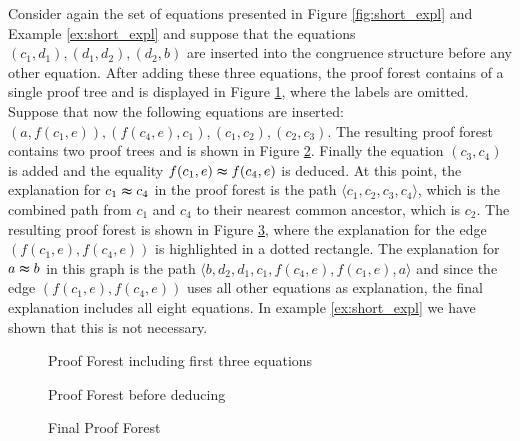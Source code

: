 \begin{example}

Consider again the set of equations presented in Figure \ref{fig:short_expl} and Example \ref{ex:short_expl} and suppose that the equations $(c_1,d_1),(d_1,d_2),(d_2,b)$ are inserted into the congruence structure before any other equation.
After adding these three equations, the proof forest contains of a single proof tree and is displayed in Figure \ref{fig:proof_forest_1}, where the labels are omitted.
Suppose that now the following equations are inserted: $(a,f(c_1,e)),(f(c_4,e),c_1),(c_1,c_2),(c_2,c_3)$.
The resulting proof forest contains two proof trees and is shown in Figure \ref{fig:proof_forest_2}.
Finally the equation $(c_3,c_4)$ is added and the equality $f(c_1,e) \thickapprox f(c_4,e)$ is deduced.
At this point, the explanation for $c_1 \thickapprox c_4$ in the proof forest is the path $\langle c_1,c_2,c_3,c_4 \rangle$, which is the combined path from $c_1$ and $c_4$ to their nearest common ancestor, which is $c_2$.
The resulting proof forest is shown in Figure \ref{fig:proof_forest_3}, where the explanation for the edge $(f(c_1,e),f(c_4,e))$ is highlighted in a dotted rectangle.
The explanation for $a \thickapprox b$ in this graph is the path $\langle b,d_2,d_1,c_1,f(c_4,e),f(c_1,e),a\rangle$ and since the edge $(f(c_1,e),f(c_4,e))$ uses all other equations as explanation, the final explanation includes all eight equations.
In example \ref{ex:short_expl} we have shown that this is not necessary.

\begin{figure}[!h]

\caption{Proof Forest including first three equations}
\label{fig:proof_forest_1}
\end{figure}

\begin{figure}[!h]

\caption{Proof Forest before deducing}
\label{fig:proof_forest_2}
\end{figure}

\begin{figure}[!h]

\caption{Final Proof Forest}
\label{fig:proof_forest_3}
\end{figure}

\end{example}



\FloatBarrier